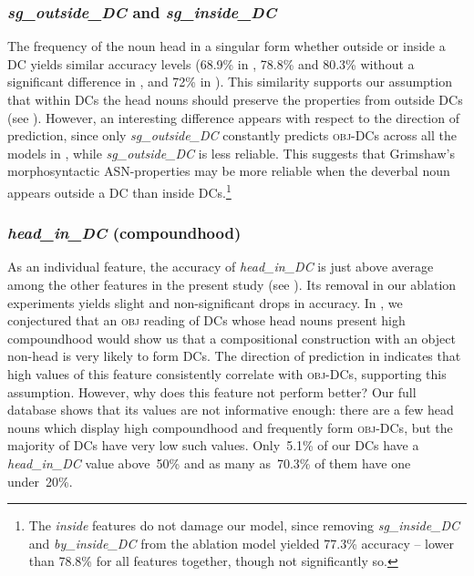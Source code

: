 \documentclass[output=paper]{langsci/langscibook}
\begin{document}
\subsubsection{\textit{sg\_outside\_DC} and \textit{sg\_inside\_DC}}
The frequency of the noun head in a singular form whether outside or inside a DC yields similar accuracy levels (68.9\% in , 78.8\% and 80.3\% without a significant difference in , and 72\% in ). This similarity supports our assumption that within DCs the head nouns should preserve the properties from outside DCs   {(see )}. However, an interesting difference appears with respect to the direction of prediction, since only \textit{sg\_outside\_DC} constantly predicts \textsc{obj}-DCs across all the models in , while \textit{sg\_outside\_DC} is less reliable. This suggests that Grimshaw's morphosyntactic ASN-properties may be more reliable when the deverbal noun appears outside a DC than inside DCs.\footnote{ {The \textit{inside} features do not damage our model,} since removing \textit{sg\_inside\_DC} and \textit{by\_inside\_DC} from the ablation model yielded 77.3\% accuracy -- lower than 78.8\% for all features together, though not significantly so.} 


\subsubsection{\textit{head\_in\_DC} (compoundhood)} 
As an individual feature, the accuracy of \textit{head\_in\_DC} is just above average among the other features in the present study (see ). Its removal in our ablation experiments  yields  slight and non-significant drops in accuracy. In , we conjectured that an \textsc{obj} reading of DCs whose head nouns present high compoundhood would show us that a compositional construction with an object non-head is very likely to form DCs. The  direction of prediction in  indicates that high values of this feature consistently correlate with \textsc{obj}-DCs, supporting this assumption. However, why does this feature not perform better? Our full database shows that its values are not informative enough: there are a few head nouns which display high compoundhood and frequently form \textsc{obj}-DCs, but the majority of DCs  have very low such values. Only~5.1\% of our DCs have a \textit{head\_\linebreak in\_DC} value above~50\% and as many as~70.3\% of them have one under~20\%. 
\end{document}
